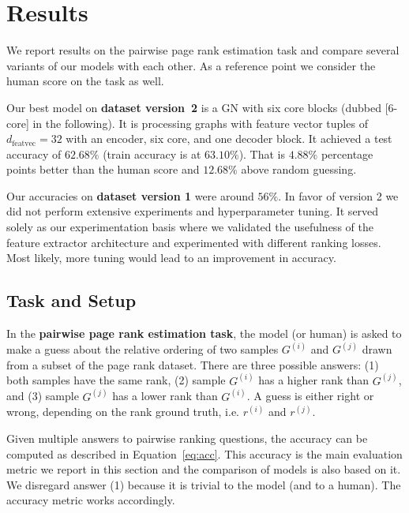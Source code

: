\section{Results}
\label{sec:results}

We report results on the pairwise page rank estimation task and compare several variants of our models with each other. As a reference point we consider the human score on the task as well.

Our best model on \textbf{dataset version~2} is a GN with six core blocks (dubbed [6-core] in the following). It is processing graphs with feature vector tuples of $d_\text{featvec}=32$ with an encoder, six core, and one decoder block. It achieved a test accuracy of $62.68\%$ (train accuracy is at $63.10\%$). That is $4.88\%$ percentage points better than the human score and $12.68\%$ above random guessing.

Our accuracies on \textbf{dataset version 1} were around $56\%$. In favor of version 2 we did not perform extensive experiments and hyperparameter tuning. It served solely as our experimentation basis where we validated the usefulness of the feature extractor architecture and experimented with different ranking losses. Most likely, more tuning would lead to an improvement in accuracy.

\subsection{Task and Setup}

In the \textbf{pairwise page rank estimation task}, the model (or human) is asked to make a guess about the relative ordering of two samples $G^{(i)}$ and $G^{(j)}$ drawn from a subset of the page rank dataset.
There are three possible answers: (1) both samples have the same rank, (2) sample $G^{(i)}$ has a higher rank than $G^{(j)}$, and (3) sample $G^{(j)}$ has a lower rank than $G^{(i)}$. A guess is either right or wrong, depending on the rank ground truth, i.e. $r^{(i)}$ and $r^{(j)}$.

Given multiple answers to pairwise ranking questions, the accuracy can be computed as described in Equation~\ref{eq:acc}. This accuracy is the main evaluation metric we report in this section and the comparison of models is also based on it. We disregard answer (1) because it is trivial to the model (and to a human). The accuracy metric works accordingly.

